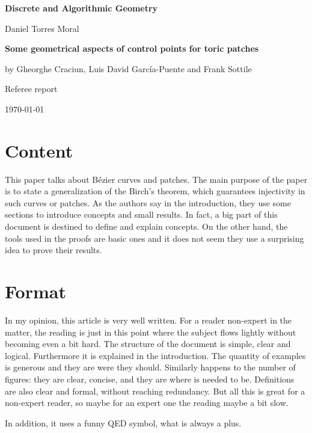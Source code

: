 \documentclass[11pt]{amsart}
\begin{document}
\begin{center}
\textbf{\sffamily
   Discrete and Algorithmic Geometry }

\medskip
  Daniel Torres Moral
\end{center}

\bigskip

\begin{center}
\large{
  \textbf{\sffamily Some geometrical aspects of control points for toric patches} 
  
  by Gheorghe Craciun, Luis David García-Puente and Frank Sottile}
  
\small{  Referee report}

\bigskip
\today

\end{center}

\bigskip

\section*{Content}

  This paper talks about Bézier curves and patches. The main purpose of the paper is to state a generalization of the Birch's theorem, which guarantees injectivity in such curves or patches. As the authors say in the introduction, they use some sections to introduce concepts and small results. In fact, a big part of this document is destined to define and explain concepts. On the other hand, the tools used in the proofs are basic ones and it does not seem they use a surprising idea to prove their results.

\section*{Format}

  In my opinion, this article is very well written. For a reader non-expert in the matter, the reading is just in this point where the subject flows lightly without becoming even a bit hard. The structure of the document is simple, clear and logical. Furthermore it is explained in the introduction. The quantity of examples is generous and they are were they should. Similarly happens to the number of figures: they are clear, concise, and they are where is needed to be. Definitions are also clear and formal, without reaching redundancy. But all this is great for a non-expert reader, so maybe for an expert one the reading maybe a bit slow.
  
  In addition, it uses a funny QED symbol, what is always a plus.
\end{document}
